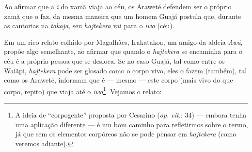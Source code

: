 Ao afirmar que a \emph{ĩ} do xamã viaja ao céu, os Araweté defendem ser
o próprio xamã que o faz, da mesma maneira que um homem Guajá postula
que, durante as cantorias na \emph{takaja}, seu \emph{hajtekera} vai
para o \emph{iwa} (céu).

Em um rico relato colhido por Magalhães, Irakatakoa, um amigo da aldeia
\emph{Awá}, propõe algo semelhante, ao afirmar que quando o
\emph{hajtekera} se encaminha para o céu é a própria pessoa que se
desloca. Se no caso Guajá, tal como entre os Waiãpi, \emph{hajtekera}
pode ser glosado como o corpo vivo, eles o fazem (também), tal como os
Araweté, informam que é --- mesmo --- este corpo (mais vivo do que corpo,
repito) que viaja até o \emph{iwa}\footnote{A ideia de ``corpogente''
  proposta por Cesarino (\emph{op. cit.}: 34) --- embora tenha uma aplicação
  diferente --- é um bom caminho para refletirmos sobre o termo, já que
  sem os elementos corpóreos não se pode pensar em \emph{hajtekera}
  (como veremos adiante).}. Vejamos o relato:

